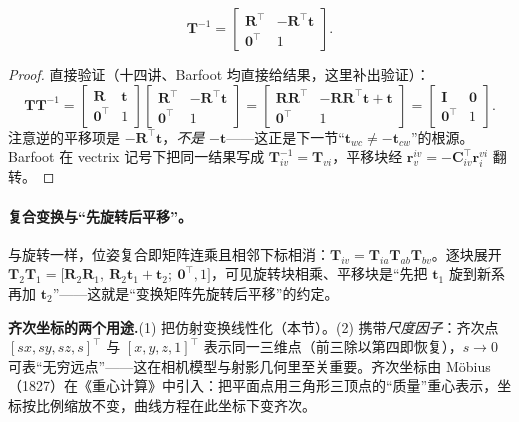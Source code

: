 \begin{proposition}[$\SE(3)$ 的逆]\label{prop:T-inv}
\begin{equation}
  \mathbf{T}^{-1}=\begin{bmatrix}\mathbf{R}^\top&-\mathbf{R}^\top\mathbf{t}\\\mathbf{0}^\top&1\end{bmatrix}.
  \label{eq:T-inv}
\end{equation}
\end{proposition}
\begin{proof}
直接验证（十四讲、Barfoot 均直接给结果，这里补出验证）：
\[
  \mathbf{T}\mathbf{T}^{-1}=\begin{bmatrix}\mathbf{R}&\mathbf{t}\\\mathbf{0}^\top&1\end{bmatrix}\begin{bmatrix}\mathbf{R}^\top&-\mathbf{R}^\top\mathbf{t}\\\mathbf{0}^\top&1\end{bmatrix}
  =\begin{bmatrix}\mathbf{R}\mathbf{R}^\top&-\mathbf{R}\mathbf{R}^\top\mathbf{t}+\mathbf{t}\\\mathbf{0}^\top&1\end{bmatrix}
  =\begin{bmatrix}\mathbf{I}&\mathbf{0}\\\mathbf{0}^\top&1\end{bmatrix}.
\]
注意逆的平移项是 $-\mathbf{R}^\top\mathbf{t}$，\emph{不是} $-\mathbf{t}$——这正是下一节“$\mathbf{t}_{wc}\neq-\mathbf{t}_{cw}$”的根源。Barfoot 在 vectrix 记号下把同一结果写成 $\mathbf{T}_{iv}^{-1}=\mathbf{T}_{vi}$，平移块经 $\mathbf{r}_v^{iv}=-\mathbf{C}_{iv}^\top\mathbf{r}_i^{vi}$ 翻转\cite{barfoot2024state}。
\end{proof}

\paragraph{复合变换与“先旋转后平移”。}与旋转一样，位姿复合即矩阵连乘且相邻下标相消：$\mathbf{T}_{iv}=\mathbf{T}_{ia}\mathbf{T}_{ab}\mathbf{T}_{bv}$。逐块展开 $\mathbf{T}_2\mathbf{T}_1=\big[\mathbf{R}_2\mathbf{R}_1,\ \mathbf{R}_2\mathbf{t}_1+\mathbf{t}_2;\ \mathbf{0}^\top,1\big]$，可见旋转块相乘、平移块是“先把 $\mathbf{t}_1$ 旋到新系再加 $\mathbf{t}_2$”——这就是“变换矩阵先旋转后平移”的约定\cite{barfoot2024state}。

\begin{note}
\textbf{齐次坐标的两个用途.}\;(1) 把仿射变换线性化（本节）。(2) 携带\emph{尺度因子}：齐次点 $[sx,sy,sz,s]^\top$ 与 $[x,y,z,1]^\top$ 表示同一三维点（前三除以第四即恢复），$s\to0$ 可表“无穷远点”——这在相机模型与射影几何里至关重要。齐次坐标由 Möbius（1827）在《重心计算》中引入：把平面点用三角形三顶点的“质量”重心表示，坐标按比例缩放不变，曲线方程在此坐标下变齐次\cite{barfoot2024state}。
\end{note}

